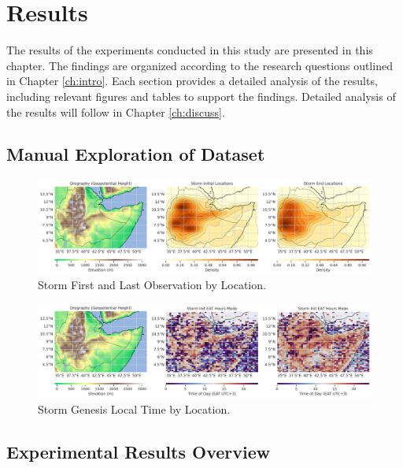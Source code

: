 \chapter{Results}
\label{ch:results}

The results of the experiments conducted in this study are presented in this chapter. The findings are organized according to the research questions outlined in Chapter \ref{ch:intro}. Each section provides a detailed analysis of the results, including relevant figures and tables to support the findings. Detailed analysis of the results will follow in Chapter \ref{ch:discuss}.

\section{Manual Exploration of Dataset}

\begin{figure}[ht]
    \centering
    \includegraphics[width=\textwidth]{../figures/generated/orography_storm_init_end_kde.png}
    \caption{Storm First and Last Observation by Location.}
    \label{fig:orography_storm_init_end_kde}
\end{figure}

\begin{figure}[ht]
    \centering
    \includegraphics[width=\textwidth]{../figures/generated/orography_storm_init_eat_hours_mode_mean.png}
    \caption{Storm Genesis Local Time by Location.}
    \label{fig:orography_storm_init_eat_hours_mode_mean}
\end{figure}

\section{Experimental Results Overview}

